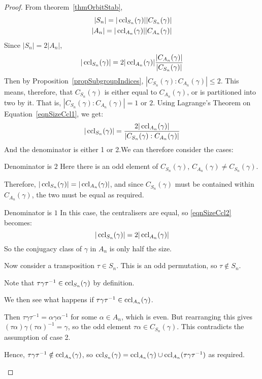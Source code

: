 \documentclass[../Main.tex]{subfiles}
\begin{document}
\begin{proof}
    From theorem~\ref{thmOrbitStab}, 
    \begin{align*}
        |S_n| = |\operatorname{ccl}_{S_n}(\gamma)||C_{S_n}(\gamma)| \\
        |A_n| = |\operatorname{ccl}_{A_n}(\gamma)||C_{A_n}(\gamma)| \\
    \end{align*}
    Since $|S_n| = 2|A_n|$,
    \begin{equation}
        |\operatorname{ccl}_{S_n}(\gamma)| = 2|\operatorname{ccl}_{A_n}(\gamma)|\frac{|C_{A_n}(\gamma)|}{|C_{S_n}(\gamma)|}
        \label{eqnSizeCcl1}
    \end{equation}
    Then by Proposition~\ref{propSubgroupIndices}, $|C_{S_n}(\gamma) : C_{A_n}(\gamma)| \leq 2$. This means, therefore, that $C_{S_n}(\gamma)$ is either equal to $C_{A_n}(\gamma)$, or is partitioned into two by it. That is, $|C_{S_n}(\gamma) : C_{A_n}(\gamma)| = 1$ or $2$. Using Lagrange's Theorem on Equation~\ref{eqnSizeCcl1}, we get:
    \begin{equation}
        |\operatorname{ccl}_{S_n}(\gamma)| = \frac{2|\operatorname{ccl}_{A_n}(\gamma)|}{|C_{S_n}(\gamma) : C_{A_n}(\gamma)|}
        \label{eqnSizeCcl2}
    \end{equation}
    And the denominator is either 1 or 2.We can therefore consider the cases:\par
    \begin{case}{Denominator is $2$}
        Here there is an odd element of $C_{S_n}(\gamma)$, $C_{A_n}(\gamma) \neq C_{S_n}(\gamma)$.\par
        Therefore, $|\operatorname{ccl}_{S_n}(\gamma)| = |\operatorname{ccl}_{A_n}(\gamma)|$, and since $C_{S_n}(\gamma)$ must be contained within $C_{A_n}(\gamma)$, the two must be equal as required.\par
    \end{case}
    \begin{case}{Denominator is $1$}
        In this case, the centralisers are equal, so \ref{eqnSizeCcl2} becomes:
        \begin{equation*}
            |\operatorname{ccl}_{S_n}(\gamma)| = 2|\operatorname{ccl}_{A_n}(\gamma)|
        \end{equation*}
        So the conjugacy class of $\gamma$ in $A_n$ is only half the size.\par
        Now consider a transposition $\tau \in S_n$. This is an odd permutation, so $\tau \notin S_n$.\par
        Note that $\tau\gamma\tau^{-1} \in \operatorname{ccl}_{S_n}(\gamma)$ by definition.\par
        We then see what happens if $\tau\gamma\tau^{-1} \in \operatorname{ccl}_{A_n}(\gamma)$.\par
        Then $\tau\gamma\tau^{-1} = \alpha\gamma\alpha^{-1}$ for some $\alpha \in A_n$, which is even. But rearranging this gives $(\tau\alpha)\gamma(\tau\alpha)^{-1} = \gamma$, so the odd element $\tau\alpha \in C_{S_n}(\gamma)$. This contradicts the assumption of case 2.\par
        Hence, $\tau\gamma\tau^{-1} \notin \operatorname{ccl}_{A_n}(\gamma)$, so $\operatorname{ccl}_{S_n}(\gamma) = \operatorname{ccl}_{A_n}(\gamma) \cup \operatorname{ccl}_{A_n}(\tau\gamma\tau^{-1})$ as required.
    \end{case}
\end{proof}
\end{document}
